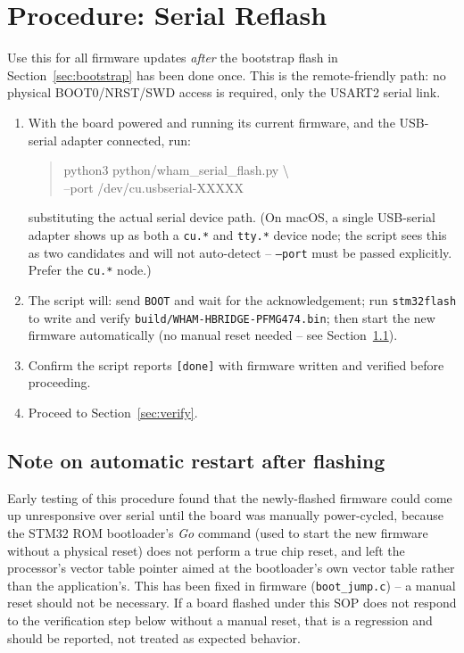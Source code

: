 \documentclass[11pt]{article}
\newcommand{\code}[1]{\texttt{#1}}
\begin{document}
\section{Procedure: Serial Reflash}
\label{sec:serial-flash}

Use this for all firmware updates \emph{after} the bootstrap flash in
Section~\ref{sec:bootstrap} has been done once. This is the
remote-friendly path: no physical BOOT0\slash NRST\slash SWD access is
required, only the USART2 serial link.

\begin{enumerate}[label=\arabic*.]
  \item With the board powered and running its current firmware, and the
    USB-serial adapter connected, run:
\begin{quote}\ttfamily\small\raggedright
python3 python/wham\_serial\_flash.py \textbackslash\\
\hspace*{1em}--port /dev/cu.usbserial-XXXXX
\end{quote}
    substituting the actual serial device path. (On macOS, a single
    USB-serial adapter shows up as both a \code{cu.*} and \code{tty.*}
    device node; the script sees this as two candidates and will not
    auto-detect -- \code{--port} must be passed explicitly. Prefer the
    \code{cu.*} node.)
  \item The script will: send \code{BOOT} and wait for the
    acknowledgement; run \code{stm32flash} to write and verify
    \code{build/WHAM-HBRIDGE-PFMG474.bin}; then start the new firmware
    automatically (no manual reset needed -- see
    Section~\ref{sec:reset-note}).
  \item Confirm the script reports \texttt{[done]} with firmware
    written and verified before proceeding.
  \item Proceed to Section~\ref{sec:verify}.
\end{enumerate}

\subsection{Note on automatic restart after flashing}
\label{sec:reset-note}

Early testing of this procedure found that the newly-flashed firmware
could come up unresponsive over serial until the board was manually
power-cycled, because the STM32 ROM bootloader's \emph{Go} command (used
to start the new firmware without a physical reset) does not perform a
true chip reset, and left the processor's vector table pointer aimed at
the bootloader's own vector table rather than the application's. This
has been fixed in firmware (\code{boot\_jump.c}) -- a manual reset should
not be necessary. If a board flashed under this SOP does not respond to
the verification step below without a manual reset, that is a
regression and should be reported, not treated as expected behavior.
\end{document}
